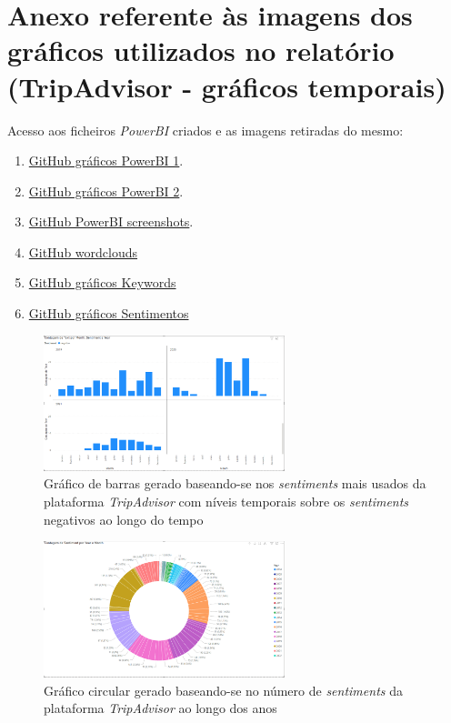 \chapter{Anexo referente às imagens dos gráficos utilizados no relatório (TripAdvisor - gráficos temporais)}
\label{an6}

Acesso aos ficheiros \textit{PowerBI} criados e as imagens retiradas do mesmo:

\begin{enumerate}
    \item \href{https://github.com/CatKinKitKat/pi2021/blob/master/projecto/sql/Graphs.pbix}{GitHub gráficos PowerBI 1}.
    \item \href{https://github.com/CatKinKitKat/pi2021/blob/master/projecto/sql/qq.pbix}{GitHub gráficos PowerBI 2}.
    \item \href{https://github.com/CatKinKitKat/pi2021/tree/master/projecto/sql/screenshotsPowerBI}{GitHub PowerBI screenshots}.
    \item \href{https://github.com/CatKinKitKat/pi2021/tree/master/projecto/datascience/sql/wordclouds}{GitHub wordclouds}
    \item \href{https://github.com/CatKinKitKat/pi2021/tree/master/projecto/datascience/sql/graphs/keywords}{GitHub gráficos Keywords}
    \item \href{https://github.com/CatKinKitKat/pi2021/tree/master/projecto/datascience/sql/graphs/sentiments}{GitHub gráficos Sentimentos}
\end{enumerate}

\begin{figure}[!htb]
\centering
\includegraphics[width=7cm]{figuras/NegPerYear/4.PNG}
\caption{Gráfico de barras gerado baseando-se nos \textit{sentiments} mais usados da plataforma \textit{TripAdvisor} com níveis temporais sobre os \textit{sentiments} negativos ao longo do tempo}
\label{fig:exemplofig}
\end{figure}

\begin{figure}[!htb]
\centering
\includegraphics[width=7cm]{figuras/NrReviewsPerYear/CircleGraph.PNG}
\caption{Gráfico circular gerado baseando-se no número de \textit{sentiments} da plataforma \textit{TripAdvisor} ao longo dos anos}
\label{fig:exemplofig}
\end{figure}

